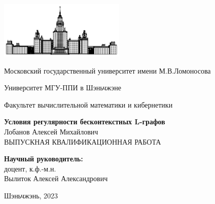 \begin{titlepage}
	\begin{center}
		\includegraphics[width=60mm]{static_images/MSU}

	    Московский государственный университет имени М.В.Ломоносова

           Университет МГУ-ППИ в Шэньчжэне 

	    
	    Факультет вычислительной математики и кибернетики

	    \bigskip
	  

	    {\Large\bfseries Условия регулярности бесконтекстных L-графов}\\[15mm]

  {\large Лобанов Алексей Михайлович}\\[5mm]

	    {ВЫПУСКНАЯ КВАЛИФИКАЦИОННАЯ РАБОТА}\\[35mm]
	       
	    

	    \begin{flushright}
	            {\bfseries Научный руководитель:}\\
	            доцент, к.ф.-м.н.\\
	            Вылиток Алексей Александрович
	    \end{flushright}

	    \vspace{\fill}
	    Шэньчжэнь, 2023
	\end{center}
\end{titlepage}

\clearpage
